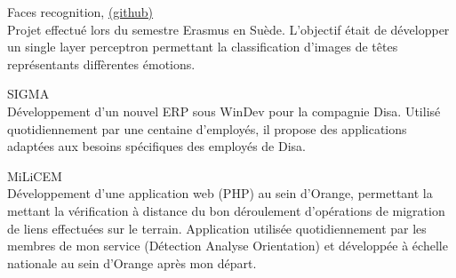 {\large Faces recognition, \href{https://github.com/ThomasRanvier/faces_recognition_nn}{(github)}}
\\
{\small Projet effectu\'e lors du semestre Erasmus en Su\`ede.
L'objectif \'etait de d\'evelopper un single layer perceptron permettant la classification d'images de t\^etes représentants diff\`erentes \'emotions.}

\medskip

{\large SIGMA}
\\
{\small D\'eveloppement d'un nouvel ERP sous WinDev pour la compagnie Disa.
Utilis\'e quotidiennement par une centaine d'employ\'es, il propose des applications adapt\'ees aux besoins sp\'ecifiques des employ\'es de Disa.}

\medskip

{\large MiLiCEM}
\\
{\small D\'eveloppement d'une application web (PHP) au sein d'Orange, permettant la mettant la vérification à distance du bon d\'eroulement d'op\'erations de migration de liens effectu\'ees sur le terrain.
Application utilis\'ee quotidiennement par les membres de mon service (D\'etection Analyse Orientation) et d\'evelopp\'ee \`a \'echelle nationale au sein d'Orange apr\`es mon d\'epart.}

\medskip
